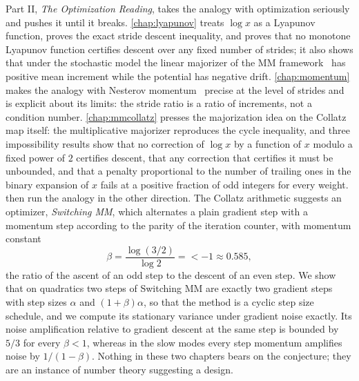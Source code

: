 Part II, \emph{The Optimization Reading}, takes the analogy with optimization
seriously and pushes it until it breaks. \cref{chap:lyapunov} treats
$\log x$ as a Lyapunov function, proves the exact stride descent inequality,
and proves that no monotone Lyapunov function certifies descent over any
fixed number of strides; it also shows that
under the stochastic model the linear majorizer of the MM framework~\cite{lange2000,hunter2004} has positive mean increment while the potential has negative drift.
\cref{chap:momentum}
makes the analogy with Nesterov momentum~\cite{nesterov1983,su2016} precise
at the level of strides and is explicit about its limits: the stride ratio is
a ratio of increments, not a condition number.
\cref{chap:mmcollatz} presses the majorization idea on the Collatz map itself: the multiplicative majorizer reproduces the cycle inequality, and three impossibility results show that no correction of $\log x$ by a function of $x$ modulo a fixed power of $2$ certifies descent, that any correction that certifies it must be unbounded, and that a penalty proportional to the number of trailing ones in the binary expansion of $x$ fails at a positive fraction of odd integers for every weight.
 then run the analogy in the other direction. The Collatz
arithmetic suggests an optimizer, \emph{Switching MM}, which alternates a
plain gradient step with a momentum step according to the parity of the
iteration counter, with momentum constant
\[
  \beta=\frac{\log(3/2)}{\log2}=\lt-1\approx0.585,
\]
the ratio of the ascent of an odd step to the descent of an even step. We show
that on quadratics two steps of Switching MM are exactly two gradient steps
with step sizes $\alpha$ and $(1+\beta)\alpha$, so that the method is a cyclic
step size schedule, and we compute its stationary variance under gradient
noise exactly. Its noise amplification relative to gradient descent at the same step is bounded
by $5/3$ for every $\beta<1$, whereas in the slow modes every step momentum amplifies noise by
$1/(1-\beta)$. Nothing in these two chapters bears on the conjecture; they are
an instance of number theory suggesting a design.
